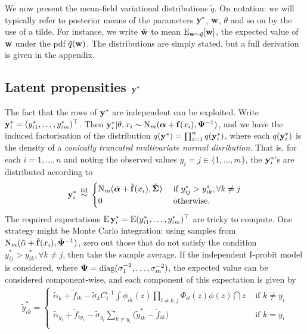 We now present the mean-field variational distributions $\tilde q$.
On notation: we will typically refer to posterior means of the parameters ${\mathbf y}^*$, ${\mathbf w}$, $\theta$ and so on by the use of a tilde.
For instance, we write $\tilde{{\mathbf w}}$ to mean $\operatorname{E}_{{\mathbf w} \sim \tilde q}[{\mathbf w}]$, the expected value of ${\mathbf w}$ under the pdf $\tilde q({\mathbf w})$.
The distributions are simply stated, but a full derivation is given in the appendix.

\subsection[Latent propensities ystar]{Latent propensities ${\mathbf y}^*$}

The fact that the rows of ${\mathbf y}^*$ are independent can be exploited.
Write ${\mathbf y}_i^* = (y_{i1}^*,\dots,y_{im}^*)^\top$.
Then ${\mathbf y}_{i}^*|\theta,x_i \sim \operatorname{N}_m({\bm\alpha} + {\mathbf f}(x_i),{\bm\Psi}^{-1})$, and we have the induced factorisation of the distribution $q({\mathbf y}^*) = \prod_{i=1}^n q({\mathbf y}_i^*)$, where each $q({\mathbf y}_i^*)$ is the density of a \emph{conically truncated multivariate normal disribution}.
That is, for each $i=1,\dots,n$ and noting the observed values $y_i = j \in \{1,\dots,m\}$, the ${\mathbf y}_i^*$'s are distributed according to
\begin{align}\label{eq:ystardist}
  {\mathbf y}_i^* \,\overset{\text{iid}}{\sim}\,
  \begin{cases}
    \operatorname{N}_m(\tilde {{\bm\alpha}} + \tilde {{\mathbf f}}(x_i), \tilde{{\bm\Sigma}}) & \text{ if } y_{ij}^* > y_{ik}^*, \forall k \neq j \\
    0 & \text{ otherwise}. \\
  \end{cases}
\end{align}
The required expectations $\operatorname{E}{\mathbf y}_i^* = \operatorname{E} (y_{i1}^*,\dots,y_{im}^*)^\top$ are tricky to compute.
One strategy might be Monte Carlo integration: using samples from $\operatorname{N}_m(\tilde \alpha + \tilde {{\mathbf f}}(x_i), \tilde{{\bm\Psi}}^{-1})$, zero out those that do not satisfy the condition $y_{ij}^* > y_{ik}^*, \forall k \neq j$, then take the sample average.
If the independent I-probit model is considered, where ${\bm\Psi} = \operatorname{diag}(\sigma_1^{-2},\dots,\sigma_m^{-2})$, the expected value can be considered component-wise, and each component of this expectation is given by
\begin{align}\label{eq:ystarupdate}
  \tilde y_{ik}^* =
  \begin{cases}
    \tilde\alpha_k + \tilde f_{ik} - \tilde\sigma_k C_i^{-1} \displaystyle{  \int \phi_{ik}(z) \prod_{l \neq k,j} \Phi_{il}(z) \phi(z) \dint z }
    &\text{ if } k \neq y_i \\[1.5em]
    \tilde\alpha_{y_i} + \tilde f_{iy_i} - \tilde\sigma_{y_i} \sum_{k \neq y_i} \big(\tilde y_{ik}^* - \tilde f_{ik} \big) 
    &\text{ if } k = y_i \\
  \end{cases}
\end{align}

